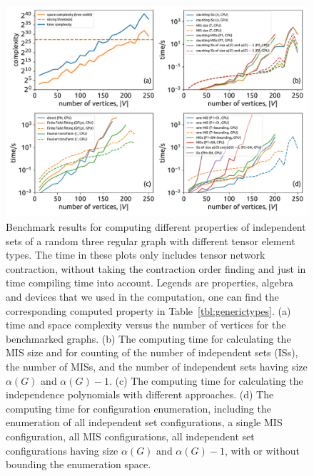 \documentclass[onefignum, onetabnum]{siamart190516}
\newcommand{\<}{\langle}
\renewcommand{\>}{\rangle}
\newcommand{\Tbl}[1]{Table~\ref{#1}}
\begin{document}
\begin{figure} 
    \centering
    \includegraphics[width=\textwidth, trim={0cm 0cm 0cm 0cm}, clip]{figures/fig1.pdf}
    \caption{Benchmark results for computing different properties of independent sets of a random three regular graph with different tensor element types.
    The time in these plots only includes tensor network contraction, without taking the contraction order finding and just in time compiling time into account.
    Legends are properties, algebra and devices that we used in the computation, one can find the corresponding computed property in \Tbl{tbl:generictypes}.
    (a) time and space complexity versus the number of vertices for the benchmarked graphs.
    (b) The computing time for calculating the MIS size and for counting of the number of independent sets (ISs), the number of MISs, and the number of independent sets having size $\alpha(G)$ and $\alpha(G)-1$.
    (c) The computing time for calculating the independence polynomials with different approaches.
    (d) The computing time for configuration enumeration, including the enumeration of all independent set configurations, a single MIS configuration, all MIS configurations, all independent set configurations having size $\alpha(G)$ and $\alpha(G)-1$,  with or without bounding the enumeration space.
    }
    \label{fig:benchmark}
\end{figure}
\end{document}
